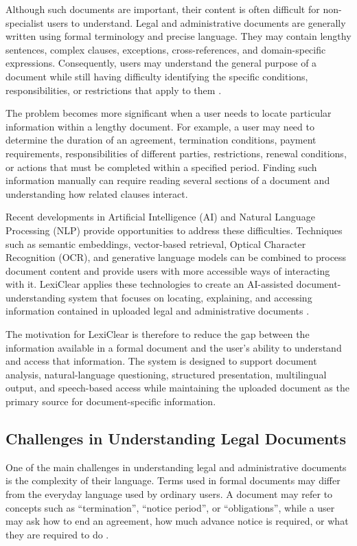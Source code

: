 \documentclass[12pt,a4paper,oneside]{report}
\begin{document}
Although such documents are important, their content is often difficult for
non-specialist users to understand. Legal and administrative documents are
generally written using formal terminology and precise language. They may
contain lengthy sentences, complex clauses, exceptions, cross-references,
and domain-specific expressions. Consequently, users may understand the
general purpose of a document while still having difficulty identifying the
specific conditions, responsibilities, or restrictions that apply to them \cite{charrow1979}.

The problem becomes more significant when a user needs to locate particular
information within a lengthy document. For example, a user may need to
determine the duration of an agreement, termination conditions, payment
requirements, responsibilities of different parties, restrictions, renewal
conditions, or actions that must be completed within a specified period.
Finding such information manually can require reading several sections of a
document and understanding how related clauses interact.

Recent developments in Artificial Intelligence (AI) and Natural Language
Processing (NLP) provide opportunities to address these difficulties.
Techniques such as semantic embeddings, vector-based retrieval, Optical
Character Recognition (OCR), and generative language models can be combined
to process document content and provide users with more accessible ways of
interacting with it. LexiClear applies these technologies to create an
AI-assisted document-understanding system that focuses on locating,
explaining, and accessing information contained in uploaded legal and
administrative documents \cite{reimers2019sbert,lewis2020rag}.

The motivation for LexiClear is therefore to reduce the gap between the
information available in a formal document and the user's ability to
understand and access that information. The system is designed to support
document analysis, natural-language questioning, structured presentation,
multilingual output, and speech-based access while maintaining the uploaded
document as the primary source for document-specific information.

\subsection{Challenges in Understanding Legal Documents}

One of the main challenges in understanding legal and administrative
documents is the complexity of their language. Terms used in formal
documents may differ from the everyday language used by ordinary users. A
document may refer to concepts such as ``termination'', ``notice period'', or
``obligations'', while a user may ask how to end an agreement, how much
advance notice is required, or what they are required to do \cite{charrow1979}.
\end{document}
